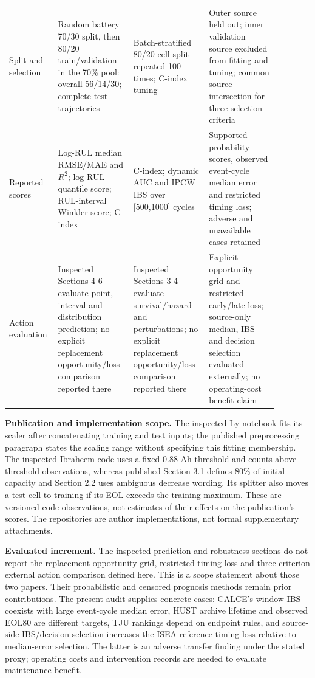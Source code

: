 \documentclass[10pt,a4paper]{article}
\begin{document}
\begin{longtable}{P{0.12\linewidth}P{0.26\linewidth}P{0.26\linewidth}P{0.24\linewidth}}
Split and selection & Random battery 70/30 split, then 80/20 train/validation in the 70\% pool: overall 56/14/30; complete test trajectories & Batch-stratified 80/20 cell split repeated 100 times; C-index tuning & Outer source held out; inner validation source excluded from fitting and tuning; common source intersection for three selection criteria\\
Reported scores & Log-RUL median RMSE/MAE and $R^2$; log-RUL quantile score; RUL-interval Winkler score; C-index & C-index; dynamic AUC and IPCW IBS over [500,1000] cycles & Supported probability scores, observed event-cycle median error and restricted timing loss; adverse and unavailable cases retained\\
Action evaluation & Inspected Sections 4-6 evaluate point, interval and distribution prediction; no explicit replacement opportunity/loss comparison reported there & Inspected Sections 3-4 evaluate survival/hazard and perturbations; no explicit replacement opportunity/loss comparison reported there & Explicit opportunity grid and restricted early/late loss; source-only median, IBS and decision selection evaluated externally; no operating-cost benefit claim\\
\end{longtable}
\endgroup

\textbf{Publication and implementation scope.} The inspected Ly notebook fits its scaler after concatenating training and test inputs; the published preprocessing paragraph states the scaling range without specifying this fitting membership. The inspected Ibraheem code uses a fixed 0.88 Ah threshold and counts above-threshold observations, whereas published Section 3.1 defines 80\% of initial capacity and Section 2.2 uses ambiguous decrease wording. Its splitter also moves a test cell to training if its EOL exceeds the training maximum. These are versioned code observations, not estimates of their effects on the publication's scores. The repositories are author implementations, not formal supplementary attachments.

\textbf{Evaluated increment.} The inspected prediction and robustness sections do not report the replacement opportunity grid, restricted timing loss and three-criterion external action comparison defined here. This is a scope statement about those two papers. Their probabilistic and censored prognosis methods remain prior contributions. The present audit supplies concrete cases: CALCE's window IBS coexists with large event-cycle median error, HUST archive lifetime and observed EOL80 are different targets, TJU rankings depend on endpoint rules, and source-side IBS/decision selection increases the ISEA reference timing loss relative to median-error selection. The latter is an adverse transfer finding under the stated proxy; operating costs and intervention records are needed to evaluate maintenance benefit.
\end{document}
